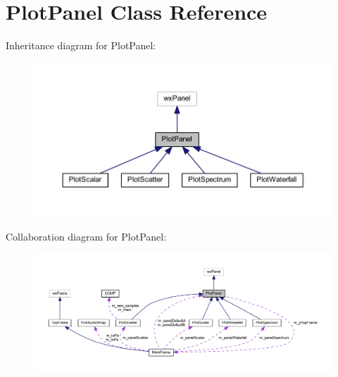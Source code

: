 \hypertarget{class_plot_panel}{\section{Plot\-Panel Class Reference}
\label{class_plot_panel}
}


Inheritance diagram for Plot\-Panel\-:
\nopagebreak
\begin{figure}[H]
\begin{center}
\leavevmode
\includegraphics[width=350pt]{class_plot_panel__inherit__graph}
\end{center}
\end{figure}


Collaboration diagram for Plot\-Panel\-:
\nopagebreak
\begin{figure}[H]
\begin{center}
\leavevmode
\includegraphics[width=350pt]{class_plot_panel__coll__graph}
\end{center}
\end{figure}
